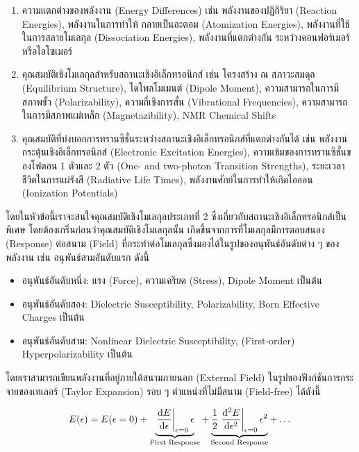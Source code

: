 \begin{enumerate}[topsep=0pt]
    \item ความแตกต่างของพลังงาน (Energy Differences) เช่น พลังงานของปฏิกิริยา (Reaction Energies), พลังงานในการทำให้%
          กลายเป็นอะตอม (Atomization Energies), พลังงานที่ใช้ในการสลายโมเลกุล (Dissociation Energies), พลังงานที่แตกต่างกัน%
          ระหว่างคอนฟอร์เมอร์หรือไอโซเมอร์

    \item คุณสมบัติเชิงโมเลกุลสำหรับสถานะเชิงอิเล็กทรอนิกส์ เช่น โครงสร้าง ณ สภาวะสมดุล (Equilibrium Structure), ไดโพลโมเมนต์
          (Dipole Moment), ความสามารถในการมีสภาพขั้ว (Polarizability), ความถี่เชิงการสั่น (Vibrational Frequencies),
          ความสามารถในการมีสภาพแม่เหล็ก (Magnetazibility), NMR Chemical Shifts

    \item คุณสมบัติที่บ่งบอกการทรานซิชั่นระหว่างสถานะเชิงอิเล็กทรอนิกส์ที่แตกต่างกันได้ เช่น พลังงานกระตุ้นเชิงอิเล็กทรอนิกส์ (Electronic
          Excitation Energies), ความเข้มของการทรานซิชั่นของโฟตอน 1 ตัวและ 2 ตัว (One- and two-photon Transition Strengths),
          ระยะเวลาชีวิตในการแผ่รังสี (Radiative Life Times), พลังงานศักย์ในการทำให้เกิดไอออน (Ionization Potentials)
\end{enumerate}

โดยในหัวข้อนี้เราจะสนใจคุณสมบัติเชิงโมเลกุลประเภทที่ 2 ซึ่งเกี่ยวกับสถานะเชิงอิเล็กทรอนิกส์เป็นพิเศษ โดยต้องเกริ่นก่อนว่าคุณสมบัติเชิงโมเลกุลนั้น%
เกิดขึ้นจากการที่โมเลกุลมีการตอบสนอง (Response) ต่อสนาม (Field) ที่กระทำต่อโมเลกุลซึ่งมองได้ในรูปของอนุพันธ์อันดับต่าง ๆ ของพลังงาน
เช่น อนุพันธ์สามอันดับแรก ดังนี้

\begin{itemize}[topsep=0pt]
    \item อนุพันธ์อันดับหนึ่ง: แรง (Force), ความเครียด (Stress), Dipole Moment เป็นต้น
    \item อนุพันธ์อันดับสอง: Dielectric Susceptibility, Polarizability, Born Effective Charges เป็นต้น
    \item อนุพันธ์อันดับสาม: Nonlinear Dielectric Susceptibility, (First-order) Hyperpolarizability เป็นต้น
\end{itemize}

โดยเราสามารถเขียนพลังงานที่อยู่ภายใต้สนามภายนอก (External Field) ในรูปของฟังก์ชันการกระจายของเทเลอร์ (Taylor Expansion)
รอบ ๆ ตำแหน่งที่ไม่มีสนาม (Field-free) ได้ดังนี้

\begin{equation}\label{eq:ener_taylor}
    E(\epsilon) = E(\epsilon = 0)
    + \underbrace{\evaluated{\dv{E}{\epsilon}}_{\epsilon = 0} \epsilon}_{%
        \text{First Response}}
    + \underbrace{\frac{1}{2} \evaluated{\dv[2]{E}{\epsilon}}_{\epsilon = 0} \epsilon^{2}}_{%
        \text{Second Response}}
    + \dots
\end{equation}

